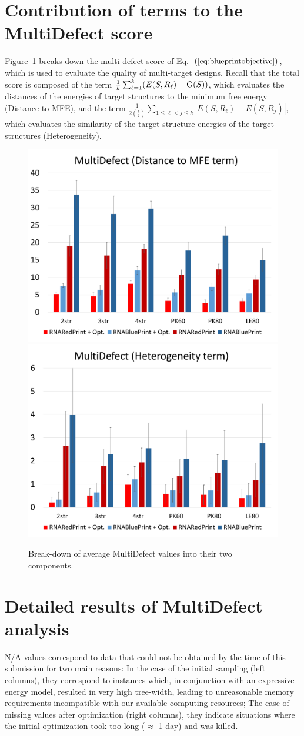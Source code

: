 \documentclass[10pt]{article}
\begin{document}
\section{Contribution of terms to the MultiDefect score}

\newcommand{\EnsE}{\text{\rm G}} %


Figure~\ref{fig:contribtions-multidefect} breaks down the multi-defect
score of Eq.~$(\ref{eq:blueprintobjective})$, which is used to
evaluate the quality of multi-target designs. Recall that the total
score is composed of the term $\frac{1}{k} \sum_{\ell=1}^{k} (E(S,
R_\ell) - \EnsE(S))$, which evaluates the distances of the energies of
target structures to the minimum free energy (Distance to MFE), and
the term $\frac{1}{2\binom{k}{2}} \sum\limits_{1\leq\ell<j\leq
  k}|E(S,R_\ell) - E(S,R_j)|$, which evaluates the similarity of the
target structure energies of the target structures (Heterogeneity).

\label{appsec:multidefect}
\begin{figure}[h!]
\includegraphics[width=.48\textwidth]{Figs/statistics-Term1}
\includegraphics[width=.48\textwidth]{Figs/statistics-Term2}
\caption{Break-down of average MultiDefect values into their two components.}
\label{fig:contribtions-multidefect}
\end{figure}



\section{Detailed results of MultiDefect analysis}\label{sec:validity}
N/A values correspond to data that could not be obtained by the time of this submission for two main reasons: In the case of the initial sampling (left columns), they correspond to instances which, in conjunction with an expressive energy model, resulted in very high tree-width, leading to unreasonable memory requirements incompatible with our available computing resources; The case of missing values after optimization  (right columns), they indicate situations where the initial optimization took too long ($\approx$ 1 day) and was killed.




%
%
%
%
%
%
%

\end{document}
